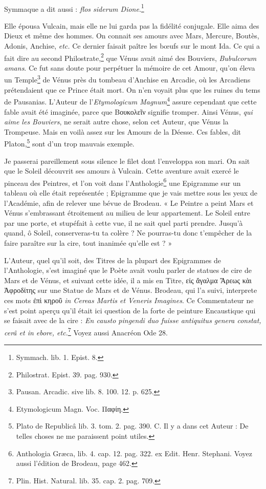 \documentclass[a4paper, 11pt, oneside, polutonikogreek, french]{article}
\begin{document}
\paragraph{}
Symmaque a dit aussi : \emph{flos siderum Dione}.\footnote{Symmach. lib. 1. Epist. 8.}

Elle épousa Vulcain, mais elle ne lui garda pas la fidélité conjugale. Elle aima des Dieux et même des hommes. On connait ses amours avec Mars, Mercure, Boutès, Adonis, Anchise, \emph{etc.} Ce dernier faisait paître les bœufs sur le mont Ida. Ce qui a fait dire au second Philostrate,\footnote{Philostrat. Epist. 39. pag. 930.} que Vénus avait aimé des Bouviers, \emph{Bubulcorum amans}. Ce fut sans doute pour perpétuer la mémoire de cet Amour, qu'on éleva un Temple\footnote{Pausan. Arcadic. sive lib. 8. 100. 12. p. 625.} de Vénus près du tombeau d'Anchise en Arcadie, où les Arcadiens prétendaient que ce Prince était mort. On n'en voyait plus que les ruines du tems de Pausanias. L'Auteur de l'\emph{Etymologicum Magnum}\footnote{Etymologicum Magn. Voc. Παφίη.} assure cependant que cette fable avait été imaginée, parce que Βουκολεῖν signifie tromper. Ainsi Vénus, \emph{qui aime les Bouviers}, ne serait autre chose, selon cet Auteur, que Vénus la Trompeuse. Mais en voilà assez sur les Amours de la Déesse. Ces fables, dit Platon,\footnote{Plato de Republicâ lib. 3. tom. 2. pag. 390. C. Il y a dans cet Auteur : De telles choses ne me paraissent point utiles.} sont d'un trop mauvais exemple.

Je passerai pareillement sous silence le filet dont l'enveloppa son mari. On sait que le Soleil découvrit ses amours à Vulcain. Cette aventure avait exercé le pinceau des Peintres, et l'on voit dans l'Anthologie\footnote{Anthologia Græca, lib. 4. cap. 12. pag. 322. ex Edit. Henr. Stephani. Voyez aussi l'édition de Brodeau, page 462.} une Epigramme sur un tableau où elle était représentée ; Epigramme que je vais mettre sous les yeux de l'Académie, afin de relever une bévue de Brodeau. « Le Peintre a peint Mars et Vénus s'embrassant étroitement au milieu de leur appartement. Le Soleil entre par une porte, et stupéfait à cette vue, il ne sait quel parti prendre. Jusqu'à quand, ô Soleil, conserveras-tu ta colère ? Ne pourras-tu donc t'empêcher de la faire paraître sur la cire, tout inanimée qu'elle est ? »

L'Auteur, quel qu'il soit, des Titres de la plupart des Epigrammes de l'Anthologie, s'est imaginé que le Poète avait voulu parler de statues de cire de Mars et de Vénus, et suivant cette idée, il a mis en Titre, εἰς ἄγαλμα Ἄρεως κὰι Ἀφροδίτης sur une Statue de Mars et de Vénus. Brodeau, qui l'a suivi, interprete ces mots ἐπὶ κηροῦ \emph{in Cereas Martis et Veneris Imagines}. Ce Commentateur ne s'est point aperçu qu'il était ici question de la forte de peinture Encaustique qui se faisait avec de la cire : \emph{En causto pingendi duo fuisse antiquitus genera constat, cerâ et in ebore, etc.}\footnote{Plin. Hist. Natural. lib. 35. cap. 2. pag. 709.} Voyez aussi Anacréon Ode 28.
\end{document}
